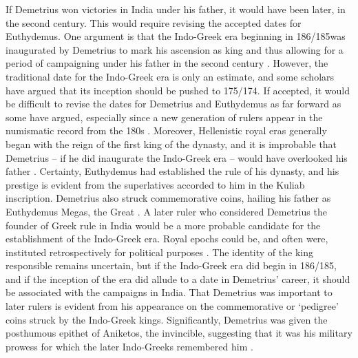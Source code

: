 \documentclass{ijsra}
\begin{document}
If Demetrius won victories in India under his father, it would have been later, in the second century\BC.
This would require revising the accepted dates for Euthydemus.
One argument is that the Indo-Greek era beginning in 186/185\BC was inaugurated by Demetrius to mark his ascension as king
and thus allowing for a period of campaigning under his father in the second century \parencite[104--105]{MacDowall2007a}.
However, the traditional date for the Indo-Greek era is only an estimate, and some scholars have argued that its inception
should be pushed to 175/174\BC \parencites[48]{Bopearachchi2011}[210--211]{Falk2009}.
If accepted, it would be difficult to revise the dates for Demetrius and Euthydemus as far forward as some have argued,
especially since a new generation of rulers appear in the numismatic record from the 180s \parencite[505]{Jakobsson2009}.
Moreover, Hellenistic royal eras generally began with the reign of the first king of the dynasty,
and it is improbable that Demetrius – if he did inaugurate the Indo-Greek era – would have overlooked his father \parencite[506]{Jakobsson2009}.
Certainty, Euthydemus had established the rule of his dynasty, and his prestige is evident from the superlatives accorded to him
in the Kuliab inscription.
Demetrius also struck commemorative coins, hailing his father as Euthydemus Megas, the Great \parencite[111]{Hollis2011}.
A later ruler who considered Demetrius the founder of Greek rule in India would be a more probable candidate for the establishment
of the Indo-Greek era.
Royal epochs could be, and often were, instituted retrospectively for political purposes \parencite[506]{Jakobsson2009}.
The identity of the king responsible remains uncertain, but if the Indo-Greek era did begin in 186/185\BC, and if the inception
of the era did allude to a date in Demetrius’ career, it should be associated with the campaigns in India.
That Demetrius was important to later rulers is evident from his appearance on the commemorative or ‘pedigree’ coins struck by
the Indo-Greek kings.
Significantly, Demetrius was given the posthumous epithet of Aniketos, the invincible,
suggesting that it was his military prowess for which the later Indo-Greeks remembered him \parencite[48]{Bopearachchi2011}.
\end{document}
